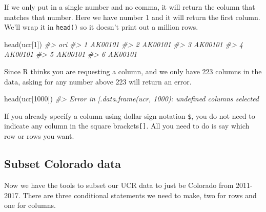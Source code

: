 \documentclass[
]{krantz}
\makeatletter
\newenvironment{Shaded}{\begin{snugshade}}{\end{snugshade}}
\newcommand{\CommentTok}[1]{\textcolor[rgb]{0.37,0.37,0.37}{\textit{#1}}}
\newcommand{\DecValTok}[1]{\textcolor[rgb]{0.06,0.06,0.06}{#1}}
\newcommand{\FunctionTok}[1]{\textcolor[rgb]{0,0,0}{#1}}
\newcommand{\NormalTok}[1]{#1}
\newcommand{\SpecialCharTok}[1]{\textcolor[rgb]{0,0,0}{#1}}
\newenvironment{kframe}{%
\medskip{}
\setlength{\fboxsep}{.8em}
 \def\at@end@of@kframe{}%
 \ifinner\ifhmode%
  \def\at@end@of@kframe{\end{minipage}}%
  \begin{minipage}{\columnwidth}%
 \fi\fi%
 \def\FrameCommand##1{\hskip\@totalleftmargin \hskip-\fboxsep
 \colorbox{shadecolor}{##1}\hskip-\fboxsep
     \hskip-\linewidth \hskip-\@totalleftmargin \hskip\columnwidth}%
 \MakeFramed {\advance\hsize-\width
   \@totalleftmargin\z@ \linewidth\hsize
   \@setminipage}}%
 {\par\unskip\endMakeFramed%
 \at@end@of@kframe}
\renewenvironment{Shaded}{\begin{kframe}}{\end{kframe}}
\makeatother
\begin{document}
If we only put in a single number and no comma, it will return the column that matches that number. Here we have number 1 and it will return the first column. We'll wrap it in \texttt{head()} so it doesn't print out a million rows.

\begin{Shaded}
\begin{Highlighting}[]
\FunctionTok{head}\NormalTok{(ucr[}\DecValTok{1}\NormalTok{])}
\CommentTok{\#\textgreater{}       ori}
\CommentTok{\#\textgreater{} 1 AK00101}
\CommentTok{\#\textgreater{} 2 AK00101}
\CommentTok{\#\textgreater{} 3 AK00101}
\CommentTok{\#\textgreater{} 4 AK00101}
\CommentTok{\#\textgreater{} 5 AK00101}
\CommentTok{\#\textgreater{} 6 AK00101}
\end{Highlighting}
\end{Shaded}

Since R thinks you are requesting a column, and we only have 223 columns in the data, asking for any number above 223 will return an error.

\begin{Shaded}
\begin{Highlighting}[]
\FunctionTok{head}\NormalTok{(ucr[}\DecValTok{1000}\NormalTok{])}
\CommentTok{\#\textgreater{} Error in \textasciigrave{}[.data.frame\textasciigrave{}(ucr, 1000): undefined columns selected}
\end{Highlighting}
\end{Shaded}

If you already specify a column using dollar sign notation \texttt{\$}, you do not need to indicate any column in the square brackets\texttt{{[}{]}}. All you need to do is say which row or rows you want.

\begin{Shaded}
\end{Shaded}

\hypertarget{subset-colorado-data}{%
\subsection{Subset Colorado data}\label{subset-colorado-data}}

Now we have the tools to subset our UCR data to just be Colorado from 2011-2017. There are three conditional statements we need to make, two for rows and one for columns.
\end{document}
